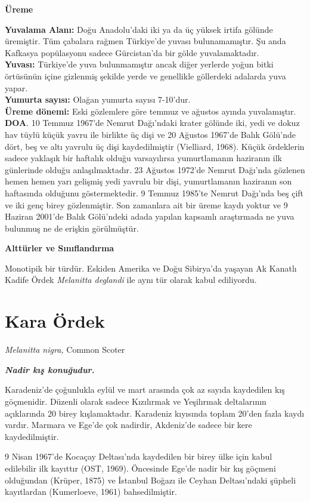 \documentclass[
  a4paper,
  DIV=11,
  numbers=noendperiod]{scrartcl}
\begin{document}
\textbf{Üreme}

\textbf{Yuvalama Alanı:} Doğu Anadolu'daki iki ya da üç yüksek irtifa
gölünde üremiştir. Tüm çabalara rağmen Türkiye'de yuvası bulunamamıştır.
Şu anda Kafkasya popülasyonu sadece Gürcistan'da bir gölde
yuvalamaktadır.\\
\textbf{Yuvası:} Türkiye'de yuva bulunmamıştır ancak diğer yerlerde
yoğun bitki örtüsünün içine gizlenmiş şekilde yerde ve genellikle
göllerdeki adalarda yuva yapar.\\
\textbf{Yumurta sayısı:} Olağan yumurta sayısı 7-10'dur.\\
\textbf{Üreme dönemi:} Eski gözlemlere göre temmuz ve ağustos ayında
yuvalamıştır. \textbf{DOA}. 10 Temmuz 1967'de Nemrut Dağı'ndaki krater
gölünde iki, yedi ve dokuz hav tüylü küçük yavru ile birlikte üç dişi ve
20 Ağustos 1967'de Balık Gölü'nde dört, beş ve altı yavrulu üç dişi
kaydedilmiştir (Vielliard, 1968). Küçük ördeklerin sadece yaklaşık bir
haftalık olduğu varsayılırsa yumurtlamanın haziranın ilk günlerinde
olduğu anlaşılmaktadır. 23 Ağustos 1972'de Nemrut Dağı'nda gözlenen
hemen hemen yarı gelişmiş yedi yavrulu bir dişi, yumurtlamanın haziranın
son haftasında olduğunu göstermektedir. 9 Temmuz 1985'te Nemrut Dağı'nda
beş çift ve iki genç birey gözlenmiştir. Son zamanlara ait bir üreme
kaydı yoktur ve 9 Haziran 2001'de Balık Gölü'ndeki adada yapılan
kapsamlı araştırmada ne yuva bulunmuş ne de erişkin görülmüştür.

\textbf{Alttürler ve Sınıflandırma}

Monotipik bir türdür. Eskiden Amerika ve Doğu Sibirya'da yaşayan Ak
Kanatlı Kadife Ördek \emph{Melanitta deglandi} ile aynı tür olarak kabul
ediliyordu.

\section{Kara Ördek}\label{kara-uxf6rdek}

\emph{Melanitta nigra,} Common Scoter

\textbf{\emph{Nadir kış konuğudur.}}

Karadeniz'de çoğunlukla eylül ve mart arasında çok az sayıda kaydedilen
kış göçmenidir. Düzenli olarak sadece Kızılırmak ve Yeşilırmak
deltalarının açıklarında 20 birey kışlamaktadır. Karadeniz kıyısında
toplam 20'den fazla kaydı vardır. Marmara ve Ege'de çok nadirdir,
Akdeniz'de sadece bir kere kaydedilmiştir.

9 Nisan 1967'de Kocaçay Deltası'nda kaydedilen bir birey ülke için kabul
edilebilir ilk kayıttır (OST, 1969). Öncesinde Ege'de nadir bir kış
göçmeni olduğundan (Krüper, 1875) ve İstanbul Boğazı ile Ceyhan
Deltası'ndaki şüpheli kayıtlardan (Kumerloeve, 1961) bahsedilmiştir.
\end{document}
